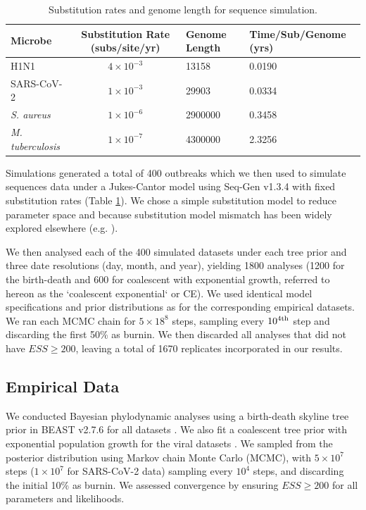 \documentclass[12pt]{article}
\begin{document}
\begin{spacing}{2}
\begin{table}[H]
    \centering
    \caption{Substitution rates and genome length for sequence simulation.}
    \begin{tabular}{lcll}
    \toprule
    Microbe                     &   Substitution Rate (subs/site/yr) & Genome Length & Time/Sub/Genome (yrs)  \\
    \midrule
    H1N1                        & $4\times10^{-3}$ & 13158 & 0.0190\\
    SARS-CoV-2                  & $1\times10^{-3}$ & 29903 & 0.0334\\
    \textit{S. aureus}    & $1\times10^{-6}$ & 2900000  & 0.3458\\
    \textit{M. tuberculosis}    &   $1\times10^{-7}$ & 4300000 & 2.3256\\
    \bottomrule
    \end{tabular}
    \label{tab:seq_parms}
\end{table}

Simulations generated a total of 400 outbreaks which we then used to simulate sequences data under a Jukes-Cantor model using Seq-Gen v1.3.4 \citep{rambaut_seq-gen_1997} with fixed substitution rates (Table \ref{tab:seq_parms}). We chose a simple substitution model to reduce parameter space and because substitution model mismatch has been widely explored elsewhere (e.g. \citet{lemmon2004importance}).

We then analysed each of the 400 simulated datasets under each tree prior and three date resolutions (day, month, and year), yielding 1800 analyses (1200 for the birth-death and 600 for coalescent with exponential growth, referred to hereon as the `coalescent exponential` or CE). We used identical model specifications and prior distributions as for the corresponding empirical datasets. We ran each MCMC chain for $5\times18^{8}$ steps, sampling every $10^{4\textnormal{th}}$ step and discarding the first 50\% as burnin. We then discarded all analyses that did not have $ESS\geq200$, leaving a total of 1670 replicates incorporated in our results.

\subsection*{Empirical Data}
We conducted Bayesian phylodynamic analyses using a birth-death skyline tree prior in BEAST v2.7.6 for all datasets \citep{bouckaert_beast_2019,stadler2012estimating}. We also fit a coalescent tree prior with exponential population growth for the viral datasets \citep{kingman_1982_coalescent}. We sampled from the posterior distribution using Markov chain Monte Carlo (MCMC), with $5\times10^{7}$ steps ($1\times10^{7}$ for SARS-CoV-2 data) sampling every $10^{4}$ steps, and discarding the initial 10\% as burnin. We assessed convergence by ensuring $ESS\geq200$ for all parameters and likelihoods.


\end{spacing}
\end{document}
